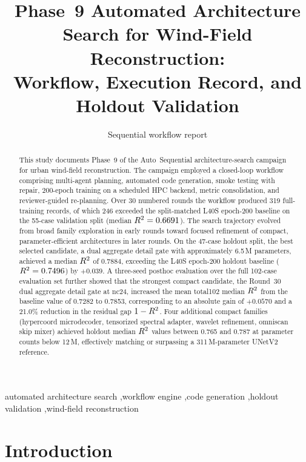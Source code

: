 ﻿\documentclass[preprint,12pt,authoryear]{elsarticle}
\newcommand{\rTwo}{R\textsuperscript{2}}
\begin{document}
\begin{frontmatter}
\title{Phase~9 Automated Architecture Search for Wind-Field Reconstruction:\\Workflow, Execution Record, and Holdout Validation}
\author{Sequential workflow report}
\address{Graph-DeepONet wind reconstruction campaign notes}
\begin{abstract}
This study documents Phase~9 of the Auto~Sequential architecture-search campaign for urban wind-field reconstruction.
The campaign employed a closed-loop workflow comprising multi-agent planning, automated code generation, smoke testing with repair, 200-epoch training on a scheduled HPC backend, metric consolidation, and reviewer-guided re-planning.
Over 30 numbered rounds the workflow produced 319 full-training records, of which 246 exceeded the split-matched L40S epoch-200 baseline on the 55-case validation split (median $\rTwo{} = 0.6691$).
The search trajectory evolved from broad family exploration in early rounds toward focused refinement of compact, parameter-efficient architectures in later rounds.
On the 47-case holdout split, the best selected candidate, a dual aggregate detail gate with approximately 6.5\,M parameters, achieved a median $\rTwo{}$ of 0.7884, exceeding the L40S epoch-200 holdout baseline ($\rTwo{} = 0.7496$) by $+0.039$.
A three-seed posthoc evaluation over the full 102-case evaluation set further showed that the strongest compact candidate, the Round~30 dual aggregate detail gate at nc24, increased the mean total102 median $\rTwo{}$ from the baseline value of 0.7282 to 0.7853, corresponding to an absolute gain of $+0.0570$ and a 21.0\% reduction in the residual gap $1-\rTwo{}$.
Four additional compact families (hypercoord microdecoder, tensorized spectral adapter, wavelet refinement, omniscan skip mixer) achieved holdout median $\rTwo{}$ values between 0.765 and 0.787 at parameter counts below 12\,M, effectively matching or surpassing a 311\,M-parameter UNetV2 reference.
\end{abstract}
\begin{keyword}
automated architecture search \sep workflow engine \sep code generation \sep holdout validation \sep wind-field reconstruction
\end{keyword}
\end{frontmatter}

\section{Introduction}
\label{sec:intro}
\end{document}
